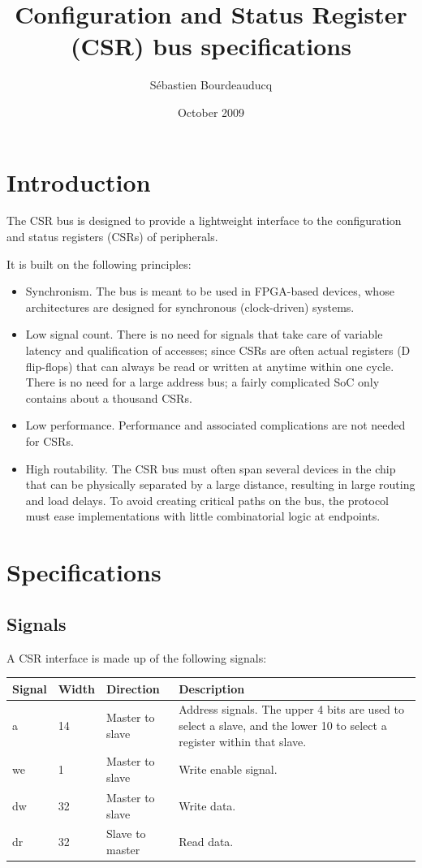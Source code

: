 \documentclass[a4paper,11pt]{article}
\title{Configuration and Status Register (CSR) bus specifications}
\author{S\'ebastien Bourdeauducq}
\date{October 2009}
\begin{document}
\setlength{\parindent}{0pt}
\setlength{\parskip}{5pt}
\maketitle{}
\section{Introduction}
The CSR bus is designed to provide a lightweight interface to the configuration and status registers (CSRs) of peripherals.

It is built on the following principles:
\begin{itemize}
\item Synchronism. The bus is meant to be used in FPGA-based devices, whose architectures are designed for synchronous (clock-driven) systems.
\item Low signal count. There is no need for signals that take care of variable latency and qualification of accesses; since CSRs are often actual registers (D flip-flops) that can always be read or written at anytime within one cycle. There is no need for a large address bus; a fairly complicated SoC only contains about a thousand CSRs.
\item Low performance. Performance and associated complications are not needed for CSRs.
\item High routability. The CSR bus must often span several devices in the chip that can be physically separated by a large distance, resulting in large routing and load delays. To avoid creating critical paths on the bus, the protocol must ease implementations with little combinatorial logic at endpoints.
\end{itemize}

\section{Specifications}
\subsection{Signals}
A CSR interface is made up of the following signals:

\begin{tabularx}{\textwidth}{|l|l|l|X|}
\hline
\bf{Signal} & \bf{Width} & \bf{Direction} & \bf{Description} \\
\hline
a & 14 & Master to slave & Address signals. The upper 4 bits are used to select a slave, and the lower 10 to select a register within that slave. \\
\hline
we & 1 & Master to slave & Write enable signal. \\
\hline
dw & 32 & Master to slave & Write data. \\
\hline
dr & 32 & Slave to master & Read data. \\
\hline
\end{tabularx}\\
\end{document}
